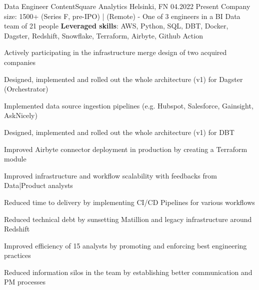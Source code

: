 

\begin{cventries}

\cventry
{Data Engineer} %
{ContentSquare} %
{Analytics} %
{Helsinki, FN} %
{04.2022} %
{Present} %
{Company size: 1500+ (Series F, pre-IPO) | (Remote) - One of 3 engineers in a BI Data team of 21 people} %
{\textbf{Leveraged skills}: AWS, Python, SQL, DBT, Docker, Dagster, Redshift, Snowflake, Terraform, Airbyte, Github Action } %
{
  \begin{cvitems} %
    \item {Actively participating in the infrastructure merge design of two acquired companies}
    \item {Designed, implemented and rolled out the whole architecture (v1) for Dagster (Orchestrator)}
    \item {Implemented data source ingestion pipelines (e.g. Hubspot, Salesforce, Gainsight, AskNicely)}
    \item {Designed, implemented and rolled out the whole architecture (v1) for DBT}
    \item {Improved Airbyte connector deployment in production by creating a Terraform module}
    \item {Improved infrastructure and workflow scalability with feedbacks from Data|Product analysts}
    \item {Reduced time to delivery by implementing CI/CD Pipelines for various workflows}
    \item {Reduced technical debt by sunsetting Matillion and legacy infrastructure around Redshift}
    \item {Improved efficiency of 15 analysts by promoting and enforcing best engineering practices }
    \item {Reduced information silos in the team by establishing better communication and PM processes}
  \end{cvitems}
}


\end{cventries}
